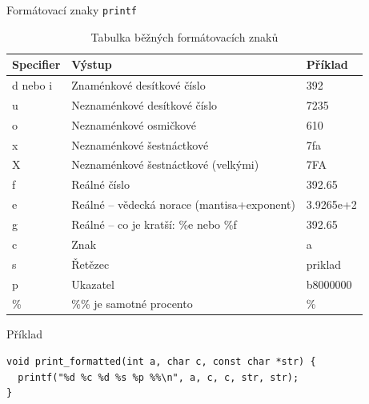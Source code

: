 \begin{frame}[fragile]{Formátovací znaky \texttt{printf}}

\begin{table}
{ \scriptsize
\begin{tabular}{|l|l|l|} \hline
\textbf{Specifier}   & \textbf{Výstup} & \textbf{Příklad} \\ \hline
d nebo i& Znaménkové desítkové číslo			& 392 \\ \hline
u	& Neznaménkové desítkové číslo			& 7235 \\ \hline
o	& Neznaménkové osmičkové			& 610 \\ \hline
x	& Neznaménkové šestnáctkové			& 7fa \\ \hline
X	& Neznaménkové šestnáctkové (velkými)		& 7FA \\ \hline
f	& Reálné číslo					& 392.65 \\ \hline
e	& Reálné -- vědecká norace (mantisa+exponent)	& 3.9265e+2 \\ \hline
g	& Reálné -- co je kratší: \%e nebo \%f		& 392.65 \\ \hline
c	& Znak						& a \\ \hline
s	& Řetězec					& priklad \\ \hline
p	& Ukazatel					& b8000000 \\ \hline
\%	& \%\% je samotné procento			& \% \\ \hline
\end{tabular}
}
\caption{Tabulka běžných formátovacích znaků}
\end{table}

  \begin{block}{Příklad}
    \begin{lstlisting}[aboveskip=2pt,belowskip=2pt]
void print_formatted(int a, char c, const char *str) {
  printf("%d %c %d %s %p %%\n", a, c, c, str, str);
}
    \end{lstlisting}
  \end{block}

\end{frame}

